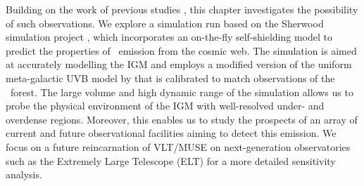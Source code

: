 Building on the work of previous studies \citep[such as those by][]{1996ApJ...468..462G, 2003ApJ...599L...1F, 2005ApJ...628...61C, 2013ApJ...763..132S, 2016MNRAS.462.1961S}, this chapter investigates the possibility of such observations. We explore a simulation run based on the Sherwood simulation project \citep{2017MNRAS.464..897B}, which incorporates an on-the-fly self-shielding model to predict the properties of \lya\ emission from the cosmic web. The simulation is aimed at accurately modelling the IGM and employs a modified version of the uniform meta-galactic UVB model by \citet[;  hereafter]{2012ApJ...746..125H} that is calibrated to match observations of the \lya\ forest. The large volume and high dynamic range of the simulation allows us to probe the physical environment of the IGM with well-resolved under- and overdense regions. Moreover, this enables us to study the prospects of an array of current and future observational facilities aiming to detect this emission. We focus on a future reincarnation of VLT/MUSE on next-generation observatories such as the Extremely Large Telescope (ELT) for a more detailed sensitivity analysis.

